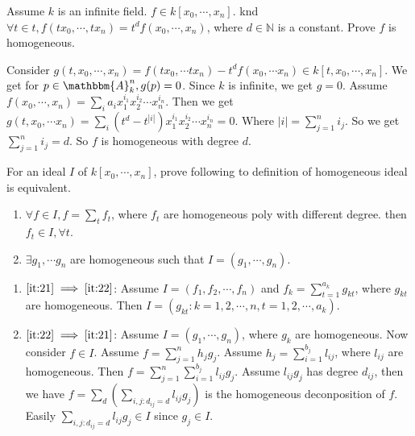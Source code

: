 \documentclass{ctexart}
\newif\ifpreface
\begin{document}
\large
\setlength{\baselineskip}{1.2em}
\ifpreface
    
\newgeometry{left=2cm,right=2cm,top=2cm,bottom=2cm}
\else
{}
\maketitle
\fi
\begin{problem}
  Assume \(k\) is an infinite field. \(f \in k[x_0,\cdots ,x_n]\). 
  knd \(\forall t \in t,f(t x_0,\cdots ,t x_n)=t^d f(x_0,\cdots ,x_n)\), where \(d \in \mathbb{N}\) is a constant. 
  Prove \(f\) is homogeneous. 
\end{problem}

\begin{solution}
  Consider \(g(t,x_0,\cdots ,x_n) = f(t x_0,\cdots t x_n)-t^d f(x_0,\cdots x_n) \in k[t,x_0,\cdots ,x_n]\). 
  We get for \(p \in \mathbbm{A}_k^n,g(p)=0\). Since \(k\) is infinite, we get \(g=0\). 
  Assume \(f(x_0,\cdots ,x_n)=\sum_{i}a_i x_1^{i_1} x_2^{i_2}\cdots x_n^{i_n} \). 
Then we get \(g(t,x_0,\cdots x_n)=\sum_{i}(t^d-t^{|i|})x_1^{i_1} x_2^{i_2}\cdots x_n^{i_n}=0\). 
Where \(|i|=\sum_{j=1}^{n} i_j\). So we get \(\sum_{j=1}^{n}i_j=d \). 
So \(f\) is homogeneous with degree \(d\). 
\end{solution}

\begin{problem}
  For an ideal \(I\) of \(k[x_0,\cdots ,x_n]\), prove following to definition of homogeneous ideal is equivalent. 
  \begin{enumerate}[ref=\theproblem.\arabic*]
    \item \label{it:21}\(\forall f \in I,f=\sum_{t}f_t \), where \(f_t\) are homogeneous poly with different degree. 
      then \(f_t \in I, \forall t\). 
    \item \label{it:22}\(\exists g_1,\cdots g_n\) are homogeneous such that \(I=(g_1,\cdots ,g_n)\). 
  \end{enumerate}
\end{problem}

\begin{solution}
  \begin{enumerate}[ref=\theproblem.\arabic*]
   \item \(\Cref{it:21} \implies \Cref{it:22}\): 
     Assume \(I=(f_1,f_2,\cdots ,f_n)\) and \(f_k=\sum_{t=1}^{a_k}g_{kt}  \), where \(g_{kt} \) are homogeneous. 
     Then \(I=(g_{kt} :k=1,2,\cdots ,n,t =1,2,\cdots ,a_k)\). 
   \item \(\Cref{it:22} \implies \Cref{it:21}\): 
     Assume \(I=(g_1,\cdots ,g_n)\), where \(g_k\) are homogeneous. Now consider \(f \in I\). 
     Assume \(f=\sum_{j=1}^{n}h_j g_j \). Assume \( h_j=\sum_{i=1}^{b_j}l_{ij}  \), where \(l_{ij} \) are homogeneous. 
     Then \(f=\sum_{j=1}^{n}\sum_{i=1}^{b_j}l_{ij} g_j  \). 
     Assume \(l_{ij} g_j\) has degree \(d_{ij} \), then we have \(f=\sum_{d} (\sum_{i,j:d_{ij} =d}l_{ij} g_j) \) is the homogeneous deconposition of \(f\). 
     Easily \(\sum_{i,j:d_{ij} =d}l_{ij} g_j \in I \) since \(g_j \in I\). 
 \end{enumerate} 
\end{solution}
\end{document}
